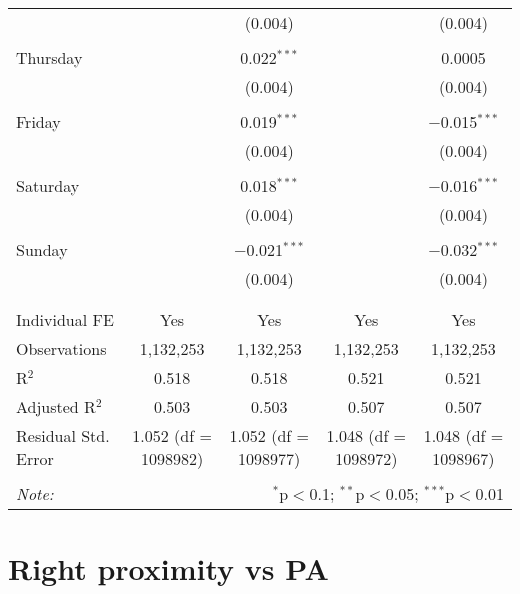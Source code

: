 \documentclass[
]{article}
\begin{document}
\begin{table}[!htbp]
{\begin{tabular}{@{\extracolsep{5pt}}lcccc}
  &  & (0.004) &  & (0.004) \\ 
  & & & & \\ 
 Thursday &  & 0.022$^{***}$ &  & 0.0005 \\ 
  &  & (0.004) &  & (0.004) \\ 
  & & & & \\ 
 Friday &  & 0.019$^{***}$ &  & $-$0.015$^{***}$ \\ 
  &  & (0.004) &  & (0.004) \\ 
  & & & & \\ 
 Saturday &  & 0.018$^{***}$ &  & $-$0.016$^{***}$ \\ 
  &  & (0.004) &  & (0.004) \\ 
  & & & & \\ 
 Sunday &  & $-$0.021$^{***}$ &  & $-$0.032$^{***}$ \\ 
  &  & (0.004) &  & (0.004) \\ 
  & & & & \\ 
\hline \\[-1.8ex] 
Individual FE & Yes & Yes & Yes & Yes \\ 
Observations & 1,132,253 & 1,132,253 & 1,132,253 & 1,132,253 \\ 
R$^{2}$ & 0.518 & 0.518 & 0.521 & 0.521 \\ 
Adjusted R$^{2}$ & 0.503 & 0.503 & 0.507 & 0.507 \\ 
Residual Std. Error & 1.052 (df = 1098982) & 1.052 (df = 1098977) & 1.048 (df = 1098972) & 1.048 (df = 1098967) \\ 
\hline 
\hline \\[-1.8ex] 
\textit{Note:}  & \multicolumn{4}{r}{$^{*}$p$<$0.1; $^{**}$p$<$0.05; $^{***}$p$<$0.01} \\ 
\end{tabular}
} 
\end{table} 
\newpage
\section{Right proximity vs PA}
\end{document}
